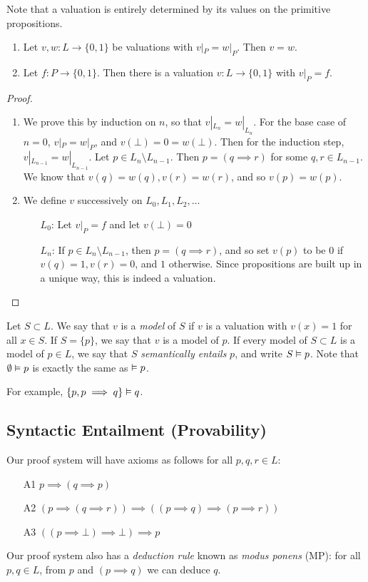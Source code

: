 \documentclass[10pt,a4paper]{article}
\begin{document}
Note that a valuation is entirely determined by its values on the primitive propositions.
\begin{proposition}
\item
\begin{enumerate}
\item Let $v, w: L \to \{0,1\}$ be valuations with $v|_P = w|_P$. Then $v=w$.
\item Let $f:P \to \{0,1\}$. Then there is a valuation $v:L \to \{0,1\}$ with $v|_P = f$.
\end{enumerate}
\end{proposition}
\begin{proof}\item
\begin{enumerate}
\item We prove this by induction on $n$, so that $v|_{L_n} = w|_{L_n}$. For the base case of $n=0$, $v|_P = w|_P$, and $v(\bot) = 0 = w(\bot)$. Then for the induction step, $v|_{L_{n-1}} = w|_{L_{n-1}}$. Let $p \in L_n \setminus L_{n-1}$. Then $p = (q \implies r)$ for some $q, r \in L_{n-1}$. We know that $v(q) = w(q), v(r) = w(r)$, and so $v(p) = w(p)$.

\item We define $v$ successively on $L_0, L_1, L_2, \ldots$
\begin{itemize}
\item[$L_0$:] Let $v|_P = f$ and let $v(\bot) = 0$
\item[$L_n$:] If $p \in L_n \setminus L_{n-1}$, then $p = (q \implies r)$, and so set $v(p)$ to be 0 if $v(q) = 1, v(r) = 0$, and $1$ otherwise. Since propositions are built up in a unique way, this is indeed a valuation.
\end{itemize}
\end{enumerate}
\end{proof}

Let $S \subset L$. We say that $v$ is a \emph{model} of $S$ if $v$ is a valuation with $v(x) = 1$ for all $x \in S$. If $S = \{p\}$, we say that $v$ is a model of $p$. If every model of $S \subset L$ is a model of $p \in L$, we say that $S$ \emph{semantically entails} $p$, and write $S \vDash p$. Note that $\emptyset \vDash p$ is exactly the same as $\vDash p$.

For example, $\{p, p\implies q\} \vDash q$.

\subsection{Syntactic Entailment (Provability)}
Our proof system will have axioms as follows for all $p, q, r \in L$:
\begin{enumerate}
\item[A1] $p \implies (q \implies p)$
\item[A2] $(p \implies (q \implies r)) \implies ((p \implies q) \implies (p \implies r))$
\item[A3] $((p \implies \bot) \implies \bot)\implies p$
\end{enumerate}
Our proof system also has a \emph{deduction rule} known as \emph{modus ponens} (MP): for all $p, q \in L$, from $p$ and $(p \implies q)$ we can deduce $q$.
\end{document}
